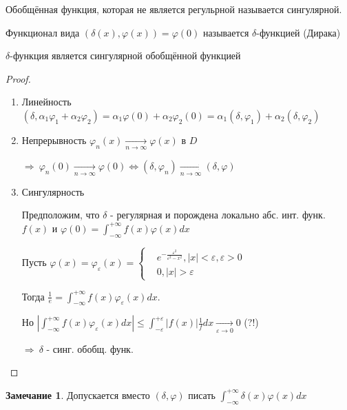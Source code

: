 \documentclass{article}
\theoremstyle{definition}
\numberwithin{theorem}{section}
\numberwithin{lemma}{section}
\numberwithin{definition}{section}
\numberwithin{corollary}{section}
\newtheorem*{remark}{Замечание}
\numberwithin{equation}{section}
\let\phi\varphi
\let\epsilon\varepsilon
\let\implies\Rightarrow
\let\iff\Leftrightarrow
\begin{document}
\begin{definition}
  Обобщённая функция, которая не является регульрной называется сингулярной.
\end{definition}
\begin{definition}
  Функционал вида $(\delta(x),\phi(x))=\phi(0)$ называется $\delta$-функцией (Дирака)
\end{definition}
\begin{theorem}
  $\delta$-функция является сингулярной обобщённой функцией
\end{theorem}
\begin{proof}
  \phantom{.}

  \begin{enumerate}
    \item Линейность $(\delta,\alpha_1\phi_1+\alpha_2\phi_2)=\alpha_1\phi(0)+\alpha_2\phi_2(0)=\alpha_1(\delta,\phi_1)+\alpha_2(\delta,\phi_2)$
    \item Непрерывность $\phi_n(x) \underset{n\to \infty}{\to}\phi(x)$ в $D$

      $\implies \ \phi_n(0)\underset{n\to\infty}{\to}\phi(0) \iff (\delta,\phi_n)\underset{n\to\infty}{\to}(\delta,\phi)$
    \item Сингулярность

      Предположим, что $\delta$ - регулярная и порождена локально абс. инт. функ. $f(x)$
      и $\phi(0)=\int_{-\infty}^{+\infty}f(x)\phi(x)dx$

      Пусть $\phi(x)=\phi_\epsilon(x)=\left\{\begin{aligned}
        & e^{-\frac{\epsilon^{2}}{\epsilon^{2}-x^{2}}}, |x|<\epsilon, \epsilon>0 \\ 
        & 0, |x|> \epsilon
      \end{aligned}\right.$

      Тогда $\frac{1}{e}=\int_{-\infty}^{+\infty}f(x)\phi_\epsilon(x)dx$.

      Но $|\int_{-\infty}^{+\infty}f(x)\phi_\epsilon(x)dx| \le \int_{-\epsilon}^{+\epsilon}|f(x)|\frac{1}{f}dx \underset{\epsilon\to 0}{\to}0$ (?!)
      
      $\implies \ \delta$ - синг. обобщ. функ.
  \end{enumerate}
\end{proof}
\begin{remark}
  Допускается вместо $(\delta,\phi)$ писать $\int_{-\infty}^{+\infty}\delta(x)\phi(x)dx$
\end{remark}
\end{document}
